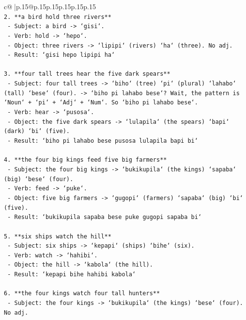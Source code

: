 \documentclass{article}
\begin{document}
{\begin{supertabular}{c@{$\;$}|p{.15\linewidth}@{}p{.15\linewidth}p{.15\linewidth}p{.15\linewidth}p{.15\linewidth}p{.15\linewidth}}
{{{\\ 
\texttt{2. **a bird hold three rivers**} \\
\texttt{   {-} Subject: a bird {-}> `gisi`.} \\
\texttt{   {-} Verb: hold {-}> `hepo`.} \\
\texttt{   {-} Object: three rivers {-}> `lipipi` (rivers) `ha` (three). No adj.} \\
\texttt{   {-} Result: `gisi hepo lipipi ha`} \\
\\ 
\texttt{3. **four tall trees hear the five dark spears**} \\
\texttt{   {-} Subject: four tall trees {-}> `biho` (tree) `pi` (plural) `lahabo` (tall) `bese` (four). {-}> `biho pi lahabo bese`? Wait, the pattern is `Noun` + `pi` + `Adj` + `Num`. So `biho pi lahabo bese`.} \\
\texttt{   {-} Verb: hear {-}> `pusosa`.} \\
\texttt{   {-} Object: the five dark spears {-}> `lulapila` (the spears) `bapi` (dark) `bi` (five).} \\
\texttt{   {-} Result: `biho pi lahabo bese pusosa lulapila bapi bi`} \\
\\ 
\texttt{4. **the four big kings feed five big farmers**} \\
\texttt{   {-} Subject: the four big kings {-}> `bukikupila` (the kings) `sapaba` (big) `bese` (four).} \\
\texttt{   {-} Verb: feed {-}> `puke`.} \\
\texttt{   {-} Object: five big farmers {-}> `gugopi` (farmers) `sapaba` (big) `bi` (five).} \\
\texttt{   {-} Result: `bukikupila sapaba bese puke gugopi sapaba bi`} \\
\\ 
\texttt{5. **six ships watch the hill**} \\
\texttt{   {-} Subject: six ships {-}> `kepapi` (ships) `bihe` (six).} \\
\texttt{   {-} Verb: watch {-}> `hahibi`.} \\
\texttt{   {-} Object: the hill {-}> `kabola` (the hill).} \\
\texttt{   {-} Result: `kepapi bihe hahibi kabola`} \\
\\ 
\texttt{6. **the four kings watch four tall hunters**} \\
\texttt{   {-} Subject: the four kings {-}> `bukikupila` (the kings) `bese` (four). No adj.} \\
}}}
\end{supertabular}}
\end{document}
